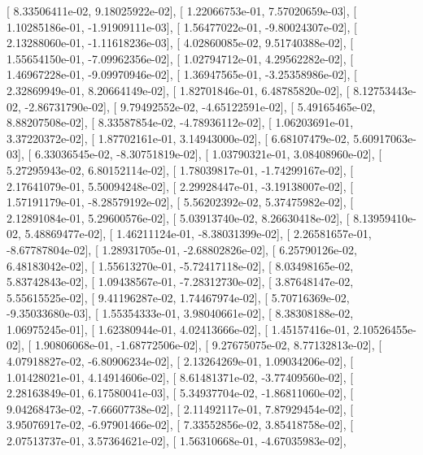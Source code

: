 \documentclass{article}
\begin{document}
       [  8.33506411e-02,   9.18025922e-02],
       [  1.22066753e-01,   7.57020659e-03],
       [  1.10285186e-01,  -1.91909111e-03],
       [  1.56477022e-01,  -9.80024307e-02],
       [  2.13288060e-01,  -1.11618236e-03],
       [  4.02860085e-02,   9.51740388e-02],
       [  1.55654150e-01,  -7.09962356e-02],
       [  1.02794712e-01,   4.29562282e-02],
       [  1.46967228e-01,  -9.09970946e-02],
       [  1.36947565e-01,  -3.25358986e-02],
       [  2.32869949e-01,   8.20664149e-02],
       [  1.82701846e-01,   6.48785820e-02],
       [  8.12753443e-02,  -2.86731790e-02],
       [  9.79492552e-02,  -4.65122591e-02],
       [  5.49165465e-02,   8.88207508e-02],
       [  8.33587854e-02,  -4.78936112e-02],
       [  1.06203691e-01,   3.37220372e-02],
       [  1.87702161e-01,   3.14943000e-02],
       [  6.68107479e-02,   5.60917063e-03],
       [  6.33036545e-02,  -8.30751819e-02],
       [  1.03790321e-01,   3.08408960e-02],
       [  5.27295943e-02,   6.80152114e-02],
       [  1.78039817e-01,  -1.74299167e-02],
       [  2.17641079e-01,   5.50094248e-02],
       [  2.29928447e-01,  -3.19138007e-02],
       [  1.57191179e-01,  -8.28579192e-02],
       [  5.56202392e-02,   5.37475982e-02],
       [  2.12891084e-01,   5.29600576e-02],
       [  5.03913740e-02,   8.26630418e-02],
       [  8.13959410e-02,   5.48869477e-02],
       [  1.46211124e-01,  -8.38031399e-02],
       [  2.26581657e-01,  -8.67787804e-02],
       [  1.28931705e-01,  -2.68802826e-02],
       [  6.25790126e-02,   6.48183042e-02],
       [  1.55613270e-01,  -5.72417118e-02],
       [  8.03498165e-02,   5.83742843e-02],
       [  1.09438567e-01,  -7.28312730e-02],
       [  3.87648147e-02,   5.55615525e-02],
       [  9.41196287e-02,   1.74467974e-02],
       [  5.70716369e-02,  -9.35033680e-03],
       [  1.55354333e-01,   3.98040661e-02],
       [  8.38308188e-02,   1.06975245e-01],
       [  1.62380944e-01,   4.02413666e-02],
       [  1.45157416e-01,   2.10526455e-02],
       [  1.90806068e-01,  -1.68772506e-02],
       [  9.27675075e-02,   8.77132813e-02],
       [  4.07918827e-02,  -6.80906234e-02],
       [  2.13264269e-01,   1.09034206e-02],
       [  1.01428021e-01,   4.14914606e-02],
       [  8.61481371e-02,  -3.77409560e-02],
       [  2.28163849e-01,   6.17580041e-03],
       [  5.34937704e-02,  -1.86811060e-02],
       [  9.04268473e-02,  -7.66607738e-02],
       [  2.11492117e-01,   7.87929454e-02],
       [  3.95076917e-02,  -6.97901466e-02],
       [  7.33552856e-02,   3.85418758e-02],
       [  2.07513737e-01,   3.57364621e-02],
       [  1.56310668e-01,  -4.67035983e-02],
\end{document}
